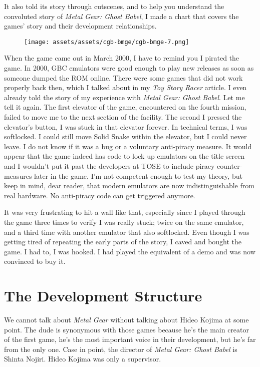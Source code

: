 \documentclass{book}
\begin{document}
It also told its story through cutscenes, and to help you understand the convoluted story of \emph{Metal Gear: Ghost Babel}, I made a chart that covers the games’ story and their development relationships.

\begin{figure}[H]
\vskip 4pt
\centering
\texttt{[image: assets/assets/cgb-bmge/cgb-bmge-7.png]}\end{figure}

When the game came out in March 2000, I have to remind you I pirated the game. In 2000, GBC emulators were good enough to play new releases as soon as someone dumped the ROM online. There were some games that did not work properly back then, which I talked about in my \emph{Toy Story Racer} article. I even already told the story of my experience with \emph{Metal Gear: Ghost Babel}. Let me tell it again. The first elevator of the game, encountered on the fourth mission, failed to move me to the next section of the facility. The second I pressed the elevator’s button, I was stuck in that elevator forever. In technical terms, I was softlocked. I could still move Solid Snake within the elevator, but I could never leave. I do not know if it was a bug or a voluntary anti-piracy measure. It would appear that the game indeed has code to lock up emulators on the title screen and I wouldn’t put it past the developers at TOSE to include piracy counter-measures later in the game. I’m not competent enough to test my theory, but keep in mind, dear reader, that modern emulators are now indistinguishable from real hardware. No anti-piracy code can get triggered anymore.

It was very frustrating to hit a wall like that, especially since I played through the game three times to verify I was really stuck; twice on the same emulator, and a third time with another emulator that also softlocked. Even though I was getting tired of repeating the early parts of the story, I caved and bought the game. I had to, I was hooked. I had played the equivalent of a demo and was now convinced to buy it.

\FloatBarrier\needspace{10mm}\section*{The Development Structure}\nopagebreak[4]

We cannot talk about \emph{Metal Gear} without talking about Hideo Kojima at some point. The dude is synonymous with those games because he’s the main creator of the first game, he’s the most important voice in their development, but he’s far from the only one. Case in point, the director of \emph{Metal Gear: Ghost Babel} is Shinta Nojiri. Hideo Kojima was only a supervisor.
\end{document}

